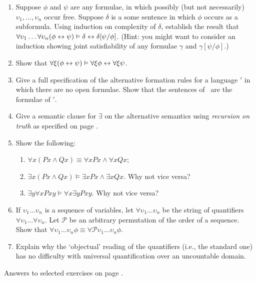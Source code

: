 {\begin{enumerate}
\begin{enumerate}
	\item If $\Gamma\vDash$ then $\Gamma[\tau/\theta]\vDash$.
\end{enumerate}
\item 	Suppose $\phi$ and $\psi$ are any formulae, in which possibly (but not necessarily) $\upsilon_{1},\ldots,\upsilon_{n}$ occur free. Suppose $\delta$ is a some sentence in which $\phi$ occurs as a subformula.  Using induction on complexity of $\delta$, establish the result that  $\forall\upsilon_{1}\ldots\forall\upsilon_{n}(\phi\leftrightarrow\psi)\vDash \delta \leftrightarrow \delta[\psi/\phi]$. (Hint: you might want to consider an induction showing joint satisfiability of any formulae $\gamma$ and $\gamma[\psi/\phi]$.)
\item Show that $\forall\xi(\phi\leftrightarrow\psi)\vDash\forall\xi\phi\leftrightarrow\forall\xi\psi$. 
\item Give a full specification of the alternative formation rules for a language \ltwo$'$ in which there are no open formulae. Show that the sentences of \ltwo\ are the formulae of \ltwo$'$.
\item Give a semantic clause for $\exists$ on the alternative semantics using \emph{recursion on truth} as specified on page \pageref{fiverectr}.
\item Show the following: \begin{enumerate}
	\item $\forall x (Px \wedge Qx) \equiv \forall x Px \wedge \forall x Qx$;
	\item $\exists x (Px \wedge Qx) \vDash \exists x Px \wedge \exists x Qx$. Why not vice versa?
	\item $\exists y \forall x Pxy \vDash \forall x \exists y Pxy$. Why not vice versa?
\end{enumerate}
\item If $\upsilon_{1}\ldots\upsilon_{n}$ is a sequence of variables, let $\forall \upsilon_{1}\ldots\upsilon_{n}$ be the string of quantifiers $\forall\upsilon_{1}\ldots\forall\upsilon_{n}$. Let $\mathcal{P}$ be an arbitrary permutation of the order of a sequence. Show that $\forall \upsilon_{1}\ldots\upsilon_{n} \phi \equiv \forall\mathcal{P}\upsilon_{1}\ldots\upsilon_{n} \phi$.
\item Explain why the `objectual' reading of the quantifiers (i.e., the standard one) has no difficulty with universal quantification over an uncountable domain.
\end{enumerate}

Answers to selected exercises on page \pageref{ans7}.
}







